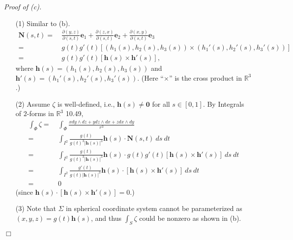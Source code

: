 \documentclass{article}
\begin{document}
\emph{Proof of (c).}
\begin{enumerate}
\item[(1)]
  Similar to (b).
  \begin{align*}
    \mathbf{N}(s,t)
    =& \: \frac{\partial(y,z)}{\partial(s,t)} \mathbf{e}_1
      + \frac{\partial(z,x)}{\partial(s,t)} \mathbf{e}_2
      + \frac{\partial(x,y)}{\partial(s,t)}\mathbf{e}_3 \\
    =& \: g(t)g'(t)[ (h_1(s),h_2(s),h_3(s)) \times (h_1'(s),h_2'(s),h_3'(s)) ] \\
    =& \: g(t)g'(t)[ \mathbf{h}(s) \times \mathbf{h}'(s)],
  \end{align*}
  where $\mathbf{h}(s) = (h_1(s),h_2(s),h_3(s))$
  and $\mathbf{h}'(s) = (h_1'(s),h_2'(s),h_3'(s))$.
  (Here ``$\times$'' is the cross product in $\mathbb{R}^3$.)

\item[(2)]
  Assume $\zeta$ is well-defined, i.e., $\mathbf{h}(s) \neq \mathbf{0}$ for all $s \in [0,1]$.
  By Integrals of $2$-forms in $\mathbb{R}^3$ 10.49,
  \begin{align*}
    \int_{\Phi} \zeta
    =& \: \int_{\Phi} \frac{x dy \wedge dz + y dz \wedge dx + z dx \wedge dy}{r^3} \\
    =& \: \int_{I^2} \frac{g(t)}{g(t)^3 |\mathbf{h}(s)|^3} \mathbf{h}(s)
      \cdot \mathbf{N}(s,t) \: ds \: dt \\
    =& \: \int_{I^2} \frac{g(t)}{g(t)^3 |\mathbf{h}(s)|^3} \mathbf{h}(s)
      \cdot g(t)g'(t)[ \mathbf{h}(s) \times \mathbf{h}'(s)] \: ds \: dt \\
    =& \: \int_{I^2} \frac{g'(t)}{g(t) |\mathbf{h}(s)|^3} \mathbf{h}(s)
      \cdot [ \mathbf{h}(s) \times \mathbf{h}'(s)] \: ds \: dt \\
    =& \: 0
  \end{align*}
  (since $\mathbf{h}(s) \cdot [ \mathbf{h}(s) \times \mathbf{h}'(s)] = 0$.)

\item[(3)]
  Note that $\Sigma$ in spherical coordinate system
  cannot be parameterized as
  $(x,y,z) = g(t)\mathbf{h}(s)$,
  and thus $\int_{S} \zeta$ could be nonzero as shown in (b).
\end{enumerate}
$\Box$ \\
\end{document}

